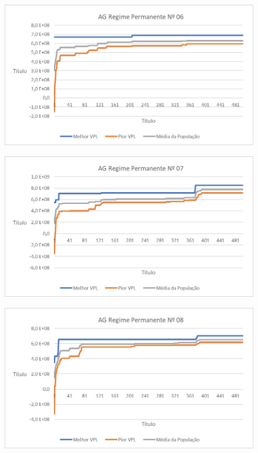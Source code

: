 \documentclass[12pt,a4paper]{report}
\begin{document}
\begin{figure}[H]
\centering

\includegraphics[scale=1]{AGRP/6}

\end{figure}

\begin{figure}[H]
\centering

\includegraphics[scale=1]{AGRP/7}

\end{figure}

\begin{figure}[H]
\centering

\includegraphics[scale=1]{AGRP/8}

\end{figure}
\end{document}
